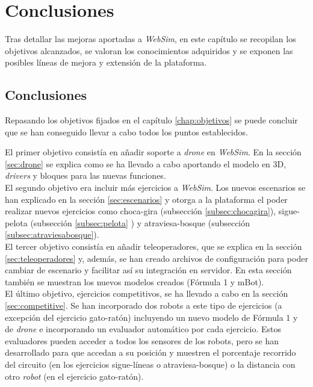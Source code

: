 \chapter{Conclusiones}
\label{chap:conclusiones}

Tras detallar las mejoras aportadas a \textit{WebSim}, en este capítulo se recopilan los objetivos alcanzados, se valoran los conocimientos adquiridos y se exponen las posibles líneas de mejora y extensión de la plataforma. 

\section{Conclusiones}
\label{sec:conclusiones}

Repasando los objetivos fijados en el capítulo \ref{chap:objetivos} se puede concluir que se han conseguido llevar a cabo todos los puntos establecidos.

El primer objetivo consistía en añadir soporte a \textit{drone} en \textit{WebSim}. En la sección \ref{sec:drone} se explica como se ha llevado a cabo aportando el modelo en 3D, \textit{drivers} y bloques para las nuevas funciones. \\

El segundo objetivo era incluir más ejercicios a \textit{WebSim}. Los nuevos escenarios se han explicado en la sección \ref{sec:escenarios} y otorga a la plataforma el poder realizar nuevos ejercicios como choca-gira (subsección \ref{subsec:chocagira}), sigue-pelota (subsección \ref{subsec:pelota} ) y atraviesa-bosque (subsección \ref{subsec:atraviesabosque}).  \\

El tercer objetivo consistía en añadir teleoperadores, que se explica en la sección \ref{sec:teleoperadores} y, además, se han creado archivos de configuración para poder cambiar de escenario y facilitar así su integración en servidor. En esta sección también se muestran los nuevos modelos creados (Fórmula 1 y mBot). \\

El último objetivo, ejercicios competitivos, se ha llevado a cabo en la sección \ref{sec:competitive}. Se han incorporado dos robots a este tipo de ejercicios (a excepción del ejercicio gato-ratón) incluyendo un nuevo modelo de Fórmula 1 y de \textit{drone} e incorporando un evaluador automático por cada ejercicio. Estos evaluadores pueden acceder a todos los sensores de los robots, pero se han desarrollado para que  accedan a su posición y muestren el porcentaje recorrido del circuito (en los ejercicios sigue-líneas o atraviesa-bosque) o la distancia con otro \textit{robot} (en el ejercicio gato-ratón). \\

